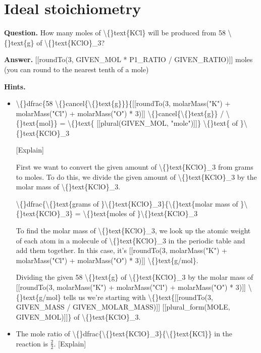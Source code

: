 \documentclass{article}
\begin{document}
\section*{Ideal stoichiometry}
\textbf{Question.} How many moles of \textbackslash\{\}text\{KCl\} will be produced from
        58 \textbackslash\{\}text\{g\} of \textbackslash\{\}text\{KClO\}\_3?

\textbf{Answer.} [[roundTo(3, GIVEN\_MOL * P1\_RATIO / GIVEN\_RATIO)]] moles (you can round to the nearest tenth of a mole)

\textbf{Hints.}
\begin{itemize}
  \item \textbackslash\{\}dfrac\{58 \textbackslash\{\}cancel\{\textbackslash\{\}text\{g\}\}\}\{[[roundTo(3, molarMass("K") + molarMass("Cl") + molarMass("O") * 3)]] \textbackslash\{\}cancel\{\textbackslash\{\}text\{g\}\} / \textbackslash\{\}text\{mol\}\} =
                \textbackslash\{\}text\{ [[plural(GIVEN\_MOL, "mole")]]\} \textbackslash\{\}text\{ of \}\textbackslash\{\}text\{KClO\}\_3
            
            [Explain]
            
                
                    First we want to convert the given amount of \textbackslash\{\}text\{KClO\}\_3 from grams to moles. To do this, we divide
                    the given amount of \textbackslash\{\}text\{KClO\}\_3 by the molar mass of \textbackslash\{\}text\{KClO\}\_3.
                
                     \textbackslash\{\}dfrac\{\textbackslash\{\}text\{grams of \}\textbackslash\{\}text\{KClO\}\_3\}\{\textbackslash\{\}text\{molar mass of \}\textbackslash\{\}text\{KClO\}\_3\} = \textbackslash\{\}text\{moles of \}\textbackslash\{\}text\{KClO\}\_3
                
                    To find the molar mass of \textbackslash\{\}text\{KClO\}\_3, we look up the atomic weight of each atom in a molecule of
                    \textbackslash\{\}text\{KClO\}\_3 in the periodic table and add them together.
                    In this case, it's [[roundTo(3, molarMass("K") + molarMass("Cl") + molarMass("O") * 3)]] \textbackslash\{\}text\{g/mol\}.
                
                    Dividing the given 58 \textbackslash\{\}text\{g\} of \textbackslash\{\}text\{KClO\}\_3 by the molar mass of
                    [[roundTo(3, molarMass("K") + molarMass("Cl") + molarMass("O") * 3)]] \textbackslash\{\}text\{g/mol\} tells us we're starting with
                    \textbackslash\{\}text\{[[roundTo(3, GIVEN\_MASS / GIVEN\_MOLAR\_MASS)]] [[plural\_form(MOLE, GIVEN\_MOL)]]\} of \textbackslash\{\}text\{KClO\}\_3.
  \item The mole ratio of \textbackslash\{\}dfrac\{\textbackslash\{\}text\{KClO\}\_3\}\{\textbackslash\{\}text\{KCl\}\} in the reaction is
                $\frac{2}{2}$.
                [Explain]
            

\end{itemize}
\end{document}
